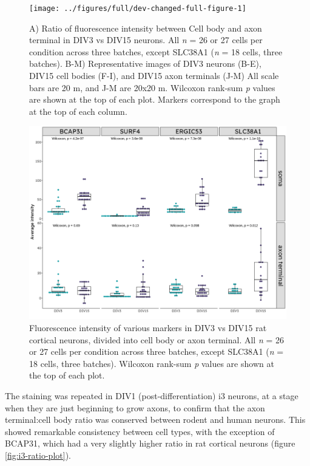 \documentclass[
  12pt,
  a4paper,
]{book}
\begin{document}
\begin{figure}
\texttt{[image: ../figures/full/dev-changed-full-figure-1]} \caption[Developmental changes in marker localisation in cortical neurons]{A) Ratio of fluorescence intensity between Cell body and axon terminal in DIV3 vs DIV15 neurons. All \emph{n} = 26 or 27 cells per condition across three batches, except SLC38A1 (\emph{n} = 18 cells, three batches). B-M) Representative images of DIV3 neurons (B-E), DIV15 cell bodies (F-I), and DIV15 axon terminals (J-M) All scale bars are 20 \textmu{}m, and J-M are 20x20 \textmu{}m. Wilcoxon rank-sum \emph{p} values are shown at the top of each plot. Markers correspond to the graph at the top of each column.\\}\label{fig:dev-changed-full-figure}
\end{figure}



\begin{figure}
\includegraphics{./figures/full/suppl-dev-grid-1} \caption[Marker intensity in cell bodies and axon terminals of developing cortical neurons]{Fluorescence intensity of various markers in DIV3 vs DIV15 rat cortical neurons, divided into cell body or axon terminal. All \emph{n} = 26 or 27 cells per condition across three batches, except SLC38A1 (\emph{n} = 18 cells, three batches). Wilcoxon rank-sum \emph{p} values are shown at the top of each plot.}\label{fig:suppl-dev-grid}
\end{figure}

The staining was repeated in DIV1 (post-differentiation) i3 neurons, at a stage when they are just beginning to grow axons, to confirm that the axon terminal:cell body ratio was conserved between rodent and human neurons. This showed remarkable consistency between cell types, with the exception of BCAP31, which had a very slightly higher ratio in rat cortical neurons (figure \ref{fig:i3-ratio-plot}).
\end{document}

